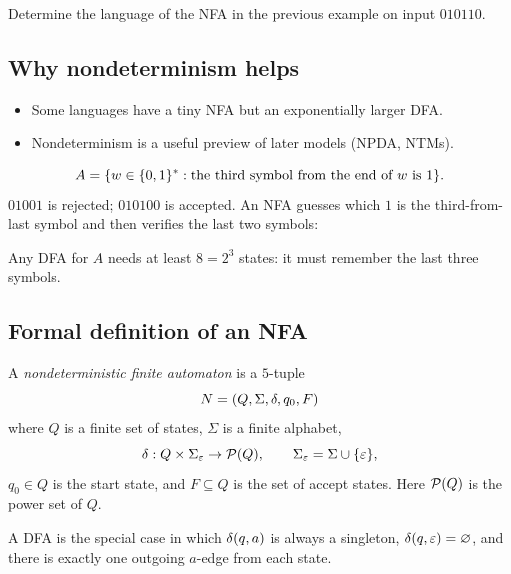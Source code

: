\begin{exercise}
Determine the language of the NFA in the previous example on input $010110$.
\end{exercise}

\subsection{Why nondeterminism helps}
\begin{itemize}
  \item Some languages have a tiny NFA but an exponentially larger DFA.
  \item Nondeterminism is a useful preview of later models (NPDA, NTMs).
\end{itemize}

\begin{example}
\[
  A=\{w\in\{0,1\}^*: \text{the third symbol from the end of }w\text{ is }1\}.
\]
$01001$ is rejected; $010100$ is accepted. An NFA guesses which $1$ is the
third-from-last symbol and then verifies the last two symbols:
\begin{center}
\end{center}
Any DFA for $A$ needs at least $8=2^3$ states: it must remember the last three
symbols.
\end{example}

\subsection{Formal definition of an NFA}
\begin{definition}[NFA]
A \emph{nondeterministic finite automaton} is a $5$-tuple
\[
  N=(Q,\Sigma,\delta,q_0,F)
\]
where $Q$ is a finite set of states, $\Sigma$ is a finite alphabet,
\[
  \delta:Q\times\Sigma_\varepsilon\to\mathcal{P}(Q),
  \qquad \Sigma_\varepsilon=\Sigma\cup\{\varepsilon\},
\]
$q_0\in Q$ is the start state, and $F\subseteq Q$ is the set of accept
states. Here $\mathcal{P}(Q)$ is the power set of $Q$.
\end{definition}
A DFA is the special case in which $\delta(q,a)$ is always a singleton,
$\delta(q,\varepsilon)=\varnothing$, and there is exactly one outgoing $a$-edge
from each state.

